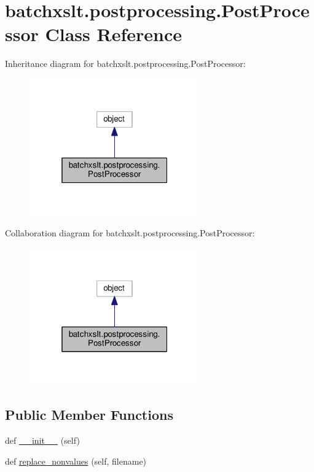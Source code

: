 \hypertarget{classbatchxslt_1_1postprocessing_1_1_post_processor}{}\section{batchxslt.\+postprocessing.\+Post\+Processor Class Reference}
\label{classbatchxslt_1_1postprocessing_1_1_post_processor}


Inheritance diagram for batchxslt.\+postprocessing.\+Post\+Processor\+:
\nopagebreak
\begin{figure}[H]
\begin{center}
\leavevmode
\includegraphics[width=208pt]{d2/d39/classbatchxslt_1_1postprocessing_1_1_post_processor__inherit__graph}
\end{center}
\end{figure}


Collaboration diagram for batchxslt.\+postprocessing.\+Post\+Processor\+:
\nopagebreak
\begin{figure}[H]
\begin{center}
\leavevmode
\includegraphics[width=208pt]{d1/d51/classbatchxslt_1_1postprocessing_1_1_post_processor__coll__graph}
\end{center}
\end{figure}
\subsection*{Public Member Functions}
\begin{DoxyCompactItemize}
\item 
def \hyperlink{classbatchxslt_1_1postprocessing_1_1_post_processor_ad58ff32843bafe5528b7c55c3e5f4905}{\+\_\+\+\_\+init\+\_\+\+\_\+} (self)
\item 
def \hyperlink{classbatchxslt_1_1postprocessing_1_1_post_processor_a3dae534d1ea47e1102225c089945c737}{replace\+\_\+nonvalues} (self, filename)
\end{DoxyCompactItemize}


